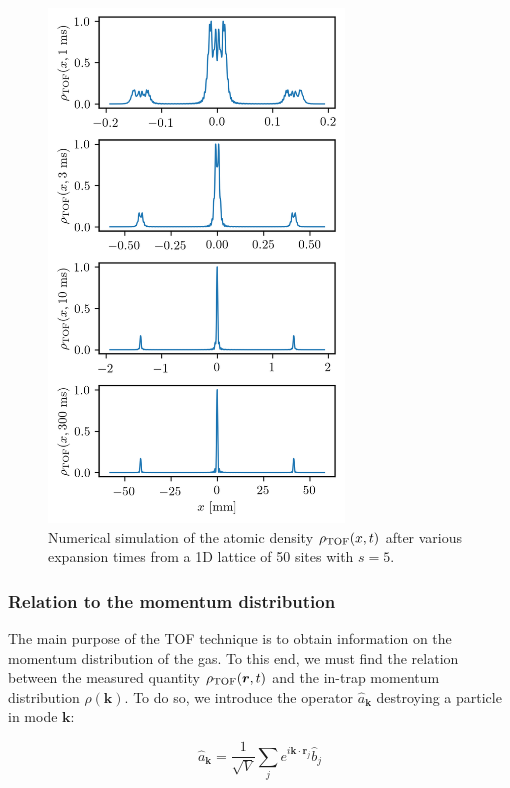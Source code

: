 \begin{figure}
    \centering
    \includegraphics[width=0.7\textwidth]{Fig/Chapter2/TOF_expansion.png}
    \caption{Numerical simulation of the atomic density $\rho_{\rm{TOF}}(x,t)$ after various expansion times from a 1D lattice of 50 sites with $s=5$.}
    \label{fig:sim_expansion}
\end{figure}

\subsubsection{Relation to the momentum distribution}

The main purpose of the TOF technique is to obtain information on the momentum distribution of the gas. To this end, we must find the relation between the measured quantity $\rho_{\rm{TOF}}(\bm{r},t)$ and the in-trap momentum distribution $\rho(\bm{k})$. To do so, we introduce the operator $\hat{a}_{\bm{k}}$ destroying a particle in mode $\bm{k}$:

\begin{equation}
    \hat{a}_{\bm{k}}=\frac{1}{\sqrt{V}} \sum_{j} e^{i \bm{k} \cdot \bm{r}_{j}} \hat{b}_{j}
\end{equation}

